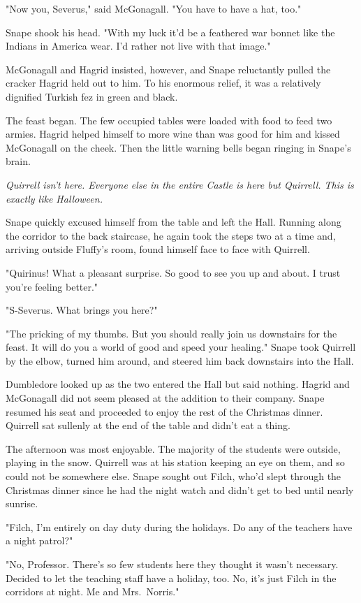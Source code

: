 "Now you, Severus," said McGonagall. "You have to have a hat, too."

Snape shook his head. "With my luck it'd be a feathered war bonnet like the Indians in America wear. I'd rather not live with that image."

McGonagall and Hagrid insisted, however, and Snape reluctantly pulled the cracker Hagrid held out to him. To his enormous relief, it was a relatively dignified Turkish fez in green and black.

The feast began. The few occupied tables were loaded with food to feed two armies. Hagrid helped himself to more wine than was good for him and kissed McGonagall on the cheek. Then the little warning bells began ringing in Snape's brain.

\emph{Quirrell isn't here. Everyone else in the entire Castle is here but Quirrell. This is exactly like Halloween.}

Snape quickly excused himself from the table and left the Hall. Running along the corridor to the back staircase, he again took the steps two at a time and, arriving outside Fluffy's room, found himself face to face with Quirrell.

"Quirinus! What a pleasant surprise. So good to see you up and about. I trust you're feeling better."

"S-Severus. What{\el} brings you here?"

"The pricking of my thumbs. But you should really join us downstairs for the feast. It will do you a world of good and speed your healing." Snape took Quirrell by the elbow, turned him around, and steered him back downstairs into the Hall.

Dumbledore looked up as the two entered the Hall but said nothing. Hagrid and McGonagall did not seem pleased at the addition to their company. Snape resumed his seat and proceeded to enjoy the rest of the Christmas dinner. Quirrell sat sullenly at the end of the table and didn't eat a thing.

The afternoon was most enjoyable. The majority of the students were outside, playing in the snow. Quirrell was at his station keeping an eye on them, and so could not be somewhere else. Snape sought out Filch, who'd slept through the Christmas dinner since he had the night watch and didn't get to bed until nearly sunrise.

"Filch, I'm entirely on day duty during the holidays. Do any of the teachers have a night patrol?"

"No, Professor. There's so few students here they thought it wasn't necessary. Decided to let the teaching staff have a holiday, too. No, it's just Filch in the corridors at night. Me and Mrs.~Norris."

